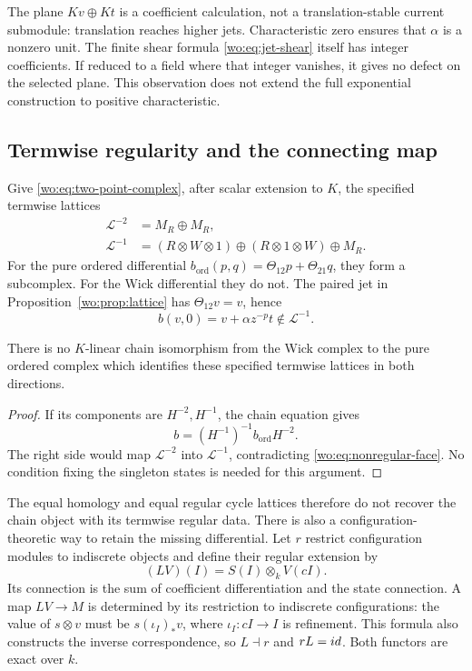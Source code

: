 The plane \(Kv\oplus Kt\) is a coefficient calculation, not a
translation-stable current submodule: translation reaches higher
jets.  Characteristic zero ensures that \(\alpha\) is a nonzero
unit.  The finite shear formula \eqref{wo:eq:jet-shear} itself has
integer coefficients.  If reduced to a field where that integer
vanishes, it gives no defect on the selected plane.  This observation
does not extend the full exponential construction to positive
characteristic.

\subsection{Termwise regularity and the connecting map}

Give \eqref{wo:eq:two-point-complex}, after scalar extension to
\(K\), the specified termwise lattices
\[
 \begin{split}
 \mathcal L^{-2}&=M_R\oplus M_R,\\
 \mathcal L^{-1}&=(R\otimes W\otimes1)
       \oplus(R\otimes1\otimes W)\oplus M_R.
 \end{split}
\]
For the pure ordered differential
\(b_{\mathrm{ord}}(p,q)=\Theta_{12}p+\Theta_{21}q\), they
form a subcomplex.  For the Wick differential they do not.  The
paired jet in Proposition~\ref{wo:prop:lattice} has
\(\Theta_{12}v=v\), hence
\begin{equation}\label{wo:eq:nonregular-face}
 b(v,0)=v+\alpha z^{-p}t\notin\mathcal L^{-1}.
\end{equation}

\begin{corollary}
\label{wo:cor:regular-chain}
There is no \(K\)-linear chain isomorphism from the Wick complex
to the pure ordered complex which identifies these specified
termwise lattices in both directions.
\end{corollary}
\begin{proof}
If its components are \(H^{-2},H^{-1}\), the chain equation gives
\[
 b=(H^{-1})^{-1}b_{\mathrm{ord}}H^{-2}.
\]
The right side would map \(\mathcal L^{-2}\) into
\(\mathcal L^{-1}\), contradicting
\eqref{wo:eq:nonregular-face}.  No condition fixing the singleton
states is needed for this argument.
\end{proof}

The equal homology and equal regular cycle lattices therefore do not
recover the chain object with its termwise regular data.  There is
also a configuration-theoretic way to retain the missing differential.
Let \(r\) restrict configuration modules to indiscrete objects and
define their regular extension by
\[
 (LV)(I)=S(I)\otimes_k V(cI).
\]
Its connection is the sum of coefficient differentiation and the
state connection.  A map \(LV\to M\) is determined by its
restriction to indiscrete configurations: the value of
\(s\otimes v\) must be \(s(\iota_I)_*v\), where
\(\iota_I:cI\to I\) is refinement.  This formula also constructs
the inverse correspondence, so \(L\dashv r\) and \(rL=id\).
Both functors are exact over \(k\).

